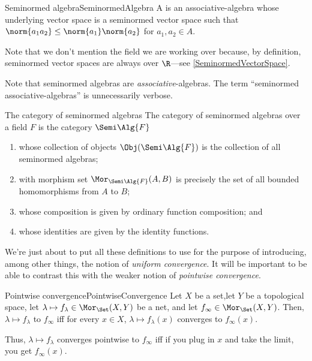 \begin{dfn}{Seminormed algebra}{SeminormedAlgebra}
A  is an associative-algebra whose underlying vector space is a seminormed vector space such that $\norm{a_1a_2}\leq \norm{a_1}\norm{a_2}$ for $a_1,a_2\in A$.
\begin{rmk}
Note that we don't mention the field we are working over because, by definition, seminormed vector spaces are always over $\R$---see \cref{SeminormedVectorSpace}.
\end{rmk}
\begin{rmk}
Note that seminormed algebras are \emph{associative}-algebras.  The term ``seminormed associative-algebras'' is unnecessarily verbose.
\end{rmk}
\end{dfn}
\begin{exm}{The category of seminormed algebras}{}
The category of seminormed algebras over a field $F$ is the category $\Semi \Alg{F}$
\begin{enumerate}
\item whose collection of objects $\Obj (\Semi \Alg{F})$ is the collection of all seminormed algebras;
\item with morphism set $\Mor _{\Semi \Alg{F}}(A,B)$ is precisely the set of all bounded homomorphisms from $A$ to $B$;
\item whose composition is given by ordinary function composition; and
\item whose identities are given by the identity functions.
\end{enumerate}
\end{exm}
We're just about to put all these definitions to use for the purpose of introducing, among other things, the notion of \emph{uniform convergence}.  It will be important to be able to contrast this with the weaker notion of \emph{pointwise convergence}.
\begin{dfn}{Pointwise convergence}{PointwiseConvergence}
Let $X$ be a set,let $Y$ be a topological space, let $\lambda \mapsto f_{\lambda}\in \Mor _{\Set}(X,Y)$ be a net, and let $f_{\infty}\in \Mor _{\Set}(X,Y)$.  Then, $\lambda \mapsto f_{\lambda}$  to $f_{\infty}$ iff for every $x\in X$, $\lambda \mapsto f_{\lambda}(x)$ converges to $f_{\infty}(x)$.
\begin{rmk}
Thus, $\lambda \mapsto f_{\lambda}$ converges pointwise to $f_{\infty}$ iff if you plug in $x$ and take the limit, you get $f_{\infty}(x)$.
\end{rmk}
\end{dfn}
